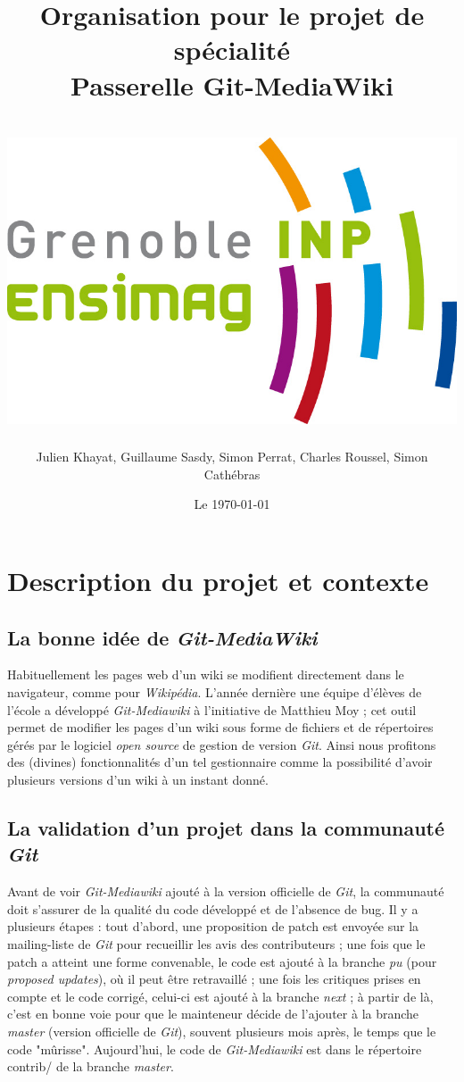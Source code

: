 \documentclass[11pt]{article}
\title{Organisation pour le projet de spécialité\\
Passerelle Git-MediaWiki\\
~\\
\includegraphics[scale=0.75]{logo_ensimag.jpg} 
}
\author{Julien Khayat, Guillaume Sasdy, Simon Perrat, Charles Roussel, Simon Cathébras}
\date{Le \today}
\begin{document}
\maketitle

\section{Description du projet et contexte}
\subsection{La bonne idée de \textit{Git-MediaWiki}}
Habituellement les pages web d'un wiki se modifient directement dans le navigateur, comme pour \textit{Wikipédia}. L'année dernière une équipe d'élèves de l'école a développé \textit{Git-Mediawiki} à l'initiative de Matthieu Moy ; cet outil permet de modifier les pages d'un wiki sous forme de fichiers et de répertoires gérés par le logiciel \textit{open source} de gestion de version \textit{Git}. Ainsi nous profitons des (divines) fonctionnalités d'un tel gestionnaire comme la possibilité d'avoir plusieurs versions d'un wiki à un instant donné.\\
\subsection{La validation d'un projet dans la communauté \textit{Git}}
Avant de voir \textit{Git-Mediawiki} ajouté à la version officielle de \textit{Git}, la communauté doit s'assurer de la qualité du code développé et de l'absence de bug. Il y a plusieurs étapes : tout d'abord, une proposition de patch est envoyée sur la mailing-liste de \textit{Git} pour recueillir les avis des contributeurs ; une fois que le patch a atteint une forme convenable, le code est ajouté à la branche \textit{pu} (pour \textit{proposed updates}), où il peut être retravaillé ; une fois les critiques prises en compte et le code corrigé, celui-ci est ajouté à la branche \textit{next} ; à partir de là, c'est en bonne voie pour que le mainteneur décide de l'ajouter à la branche \textit{master} (version officielle de \textit{Git}), souvent plusieurs mois après, le temps que le code "mûrisse". Aujourd'hui, le code de \textit{Git-Mediawiki} est dans le répertoire contrib/ de la branche \textit{master}.\\
\end{document}
